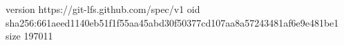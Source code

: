version https://git-lfs.github.com/spec/v1
oid sha256:661aeed1140eb51f1f55aa45abd30f50377cd107aa8a57243481af6e9e481be1
size 197011
